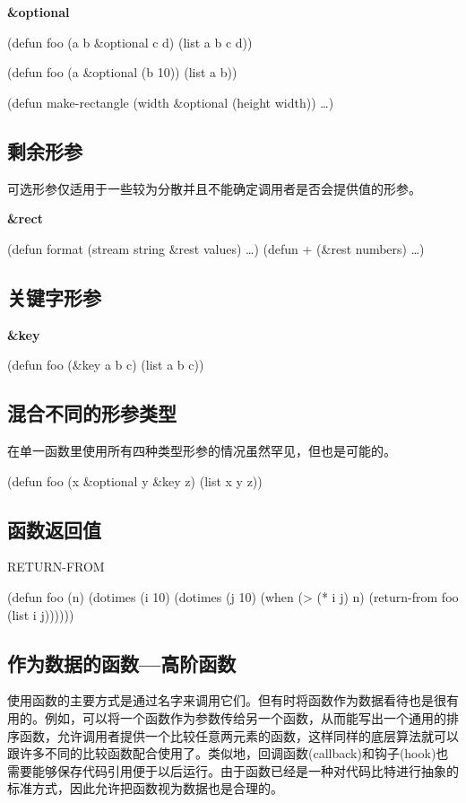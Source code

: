 \documentclass{ctexart}
\begin{document}
\textbf{\&optional}

(defun foo (a b \&optional c d) (list a b c d))

(defun foo (a \&optional (b 10)) (list a b))

(defun make-rectangle (width \&optional (height width)) \ldots{})

\subsection{剩余形参}
\label{sec-1-4}
可选形参仅适用于一些较为分散并且不能确定调用者是否会提供值的形参。

\textbf{\&rect}

(defun format (stream string \&rest values) \ldots{})
(defun + (\&rest numbers) \ldots{})

\subsection{关键字形参}
\label{sec-1-5}
\textbf{\&key}

(defun foo (\&key a b c) (list a b c))

\subsection{混合不同的形参类型}
\label{sec-1-6}
在单一函数里使用所有四种类型形参的情况虽然罕见，但也是可能的。

(defun foo (x \&optional y \&key z) (list x y z))

\subsection{函数返回值}
\label{sec-1-7}

RETURN-FROM

(defun foo (n)
  (dotimes (i 10)
    (dotimes (j 10)
      (when (> (* i j) n)
        (return-from foo (list i j))))))

\subsection{作为数据的函数---高阶函数}
\label{sec-1-8}
使用函数的主要方式是通过名字来调用它们。但有时将函数作为数据看待也是很有用的。例如，可以将一个函数作为参数传给另一个函数，从而能写出一个通用的排序函数，允许调用者提供一个比较任意两元素的函数，这样同样的底层算法就可以跟许多不同的比较函数配合使用了。类似地，回调函数(callback)和钩子(hook)也需要能够保存代码引用便于以后运行。由于函数已经是一种对代码比特进行抽象的标准方式，因此允许把函数视为数据也是合理的。
\end{document}
